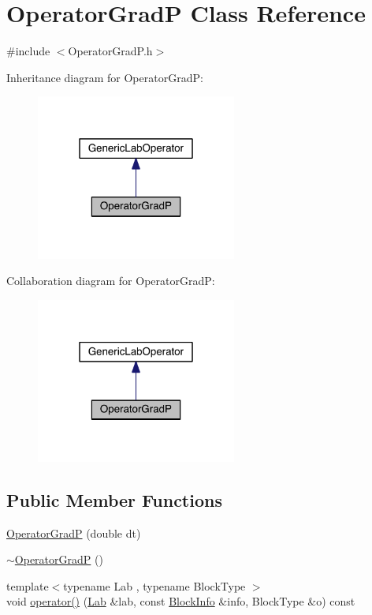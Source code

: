 \hypertarget{class_operator_grad_p}{}\section{Operator\+Grad\+P Class Reference}
\label{class_operator_grad_p}


{\ttfamily \#include $<$Operator\+Grad\+P.\+h$>$}



Inheritance diagram for Operator\+Grad\+P\+:\nopagebreak
\begin{figure}[H]
\begin{center}
\leavevmode
\includegraphics[width=187pt]{da/d8c/class_operator_grad_p__inherit__graph}
\end{center}
\end{figure}


Collaboration diagram for Operator\+Grad\+P\+:\nopagebreak
\begin{figure}[H]
\begin{center}
\leavevmode
\includegraphics[width=187pt]{d5/da5/class_operator_grad_p__coll__graph}
\end{center}
\end{figure}
\subsection*{Public Member Functions}
\begin{DoxyCompactItemize}
\item 
\hyperlink{class_operator_grad_p_a90f6bdde5a07401f14be380ef6cf13e0}{Operator\+Grad\+P} (double dt)
\item 
\hyperlink{class_operator_grad_p_a1e88f7317d635f1f842158663b197911}{$\sim$\+Operator\+Grad\+P} ()
\item 
{\footnotesize template$<$typename Lab , typename Block\+Type $>$ }\\void \hyperlink{class_operator_grad_p_a0783ffd9da959ff251913634ebd16487}{operator()} (\hyperlink{_definitions_8h_ad6f951af9a2a6ebc1975404882b34314}{Lab} \&lab, const \hyperlink{struct_block_info}{Block\+Info} \&info, Block\+Type \&o) const 
\end{DoxyCompactItemize}
